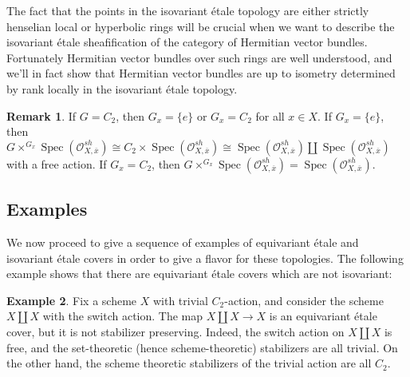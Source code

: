 \documentclass[edeposit,fullpage]{uiucthesis2009}
\newcommand{\mc}{\mathcal}
\DeclareMathOperator{\Spec}{Spec}
\theoremstyle{plain}
\newtheorem{lemma}{Lemma}
\numberwithin{lemma}{section}
\theoremstyle{definition}
\newtheorem{example}[lemma]{Example}
\newtheorem{remark}[lemma]{Remark}
\begin{document}
The fact that the points in the isovariant \'etale topology are either
strictly henselian local or hyperbolic rings will be crucial when we want to describe
the isovariant \'etale sheafification of the category of Hermitian
vector bundles. Fortunately Hermitian vector bundles over such rings
are well understood, and we'll in fact show that Hermitian vector bundles
are up to isometry determined by rank locally in the isovariant
\'etale topology. 

\begin{remark}
If $G = C_2$, then $G_x = \{e\}$ or $G_x = C_2$ for all $x \in X$. If
$G_x = \{e\}$, then $G \times^{G_x} \Spec(\mc O^{sh}_{X,\overline x})
\cong C_2 \times \Spec(\mc O^{sh}_{X,\overline x}) \cong \Spec(\mc
O^{sh}_{X,\overline x})\coprod \Spec(\mc O^{sh}_{X,\overline x})$ with a
free action. If $G_x = C_2$, then $G \times^{G_x} \Spec(\mc
O^{sh}_{X,\overline x}) = \Spec(\mc
O^{sh}_{X,\overline x})$.
\end{remark}

\subsection{Examples}

We now proceed to give a sequence of examples of equivariant \'etale
and isovariant \'etale covers in order to give a flavor for these
topologies. The following example shows that there are equivariant \'etale covers
which are not isovariant:

\begin{example}
Fix a scheme $X$ with trivial $C_2$-action, and consider the scheme $X \coprod X$ with the
switch action. The map $X \coprod X \rightarrow X$ is an equivariant
\'etale cover, but it is not stabilizer preserving. Indeed, the switch
action on $X \coprod X$ is free, and the set-theoretic (hence
scheme-theoretic) stabilizers are all trivial. On the other hand, the
scheme theoretic stabilizers of the trivial action are all $C_2$.
\end{example}





\end{document}

